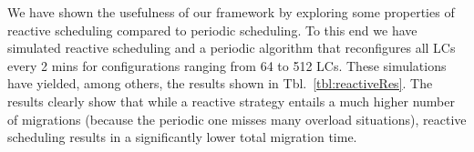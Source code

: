 We have shown the usefulness of our framework by exploring some
properties of reactive scheduling compared to periodic scheduling. To
this end we have simulated reactive scheduling and a periodic
algorithm that reconfigures all LCs every 2 mins for configurations
ranging from 64 to 512 LCs. These simulations have yielded, among
others, the results shown in Tbl.~\ref{tbl:reactiveRes}. The results
clearly show that while a reactive strategy entails a much higher
number of migrations (because the periodic one misses many overload
situations), reactive scheduling results in a significantly lower
total migration time.







